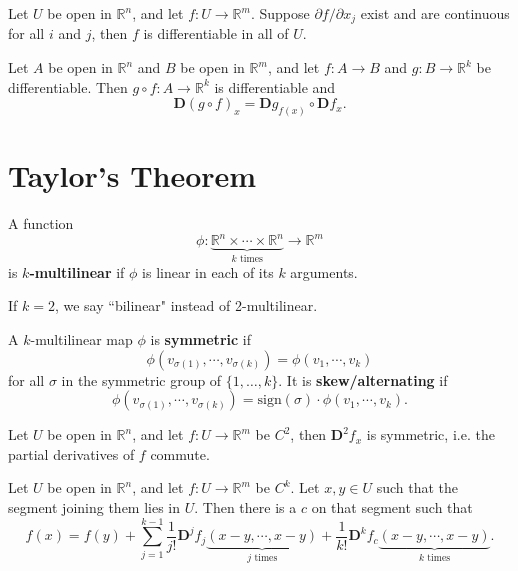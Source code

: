 \documentclass[twoside,10pt]{report}
\begin{document}
\begin{thrm}[]
Let $U$ be open in $\mathbb{R}^n$, and let $f:U \to \mathbb{R}^m$. Suppose $\partial f / \partial x_j$ exist and are continuous for all $i$ and $j$, then $f$ is differentiable in all of $U$.
\end{thrm}

\begin{thrm}
Let $A$ be open in $\mathbb{R}^n$ and $B$ be open in $\mathbb{R}^m$, and let $f:A\to B$ and $g:B \to \mathbb{R}^k$ be differentiable. Then $g \circ f: A \to \mathbb{R}^k$ is differentiable and
\[
	\mathbf{D}(g \circ f)_x = \mathbf{D}g_{f(x)} \circ \mathbf{D}f_x.
\] 
\end{thrm}


\section{Taylor's Theorem}

\begin{defn}[]
	A function \[\phi: \underbrace{\mathbb{R}^n \times \cdots \times \mathbb{R}^n}_{k \text{ times}} \to \mathbb{R}^m\] is \textbf{$k$-multilinear} if $\phi$ is linear in each of its $k$ arguments.
\end{defn}

If $k=2$, we say ``bilinear" instead of 2-multilinear.

\begin{defn}[]
A $k$-multilinear map $\phi$ is \textbf{symmetric} if
\[
	\phi(v_{\sigma(1)}, \cdots, v_{\sigma(k)}) = \phi(v_1, \cdots, v_k)
\] for all $\sigma$ in the symmetric group of $\{ 1, \dots, k\}$. It is \textbf{skew/alternating} if
\[
	\phi(v_{\sigma(1)}, \cdots, v_{\sigma(k)}) = \text{sign}(\sigma) \cdot \phi(v_1, \cdots, v_k).
\] 
\end{defn}

\begin{thrm}[]
	Let $U$ be open in $\mathbb{R}^n$, and let $f:U \to \mathbb{R}^m$ be $C^2$, then $\mathbf{D}^2f_x$ is symmetric, i.e. the partial derivatives of $f$ commute.
\end{thrm}

\begin{thrm}
Let $U$ be open in $\mathbb{R}^n$, and let $f: U \to \mathbb{R}^m$ be $C^k$. Let $x,y \in U$ such that the segment joining them lies in $U$. Then there is a $c$ on that segment such that
\[
	f(x) = f(y) + \sum_{j=1}^{k-1} \frac{1}{j!} \mathbf{D}^j f_j \underbrace{(x-y, \cdots, x-y)}_{j \text{ times}} + \frac{1}{k!} \mathbf{D}^k f_c \underbrace{(x-y, \cdots, x-y)}_{k \text{ times}}.
\] 
\end{thrm}
\end{document}
